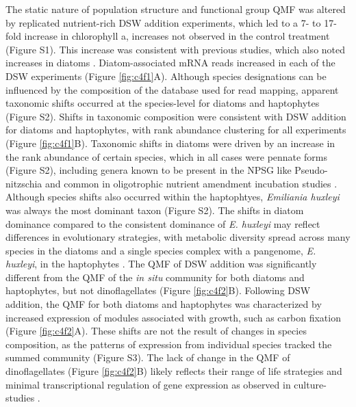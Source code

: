 The static nature of population structure and functional group QMF was altered by replicated nutrient-rich DSW addition experiments, which led to a 7- to 17-fold increase in chlorophyll a, increases not observed in the control treatment (Figure S1). This increase was consistent with previous studies, which also noted increases in diatoms \citep{McAndrew2007}. Diatom-associated mRNA reads increased in each of the DSW experiments (Figure \ref{fig:c4f1}A). Although species designations can be influenced by the composition of the database used for read mapping, apparent taxonomic shifts occurred at the species-level for diatoms and haptophytes (Figure S2). Shifts in taxonomic composition were consistent with DSW addition for diatoms and haptophytes, with rank abundance clustering for all experiments (Figure \ref{fig:c4f1}B).  Taxonomic shifts in diatoms were driven by an increase in the rank abundance of certain species, which in all cases were pennate forms (Figure S2), including genera known to be present in the NPSG like Pseudo-nitzschia \citep{Silver2010} and common in oligotrophic nutrient amendment incubation studies \citep{Marchetti2005, Marchetti2012a}. Although species shifts also occurred within the haptophtyes, \textit{Emiliania huxleyi} was always the most dominant taxon (Figure S2). The shifts in diatom dominance compared to the consistent dominance of \textit{E. huxleyi} may reflect differences in evolutionary strategies, with metabolic diversity spread across many species in the diatoms and a single species complex with a pangenome, \textit{E. huxleyi}, in the haptophytes \citep{Read2013}. The QMF of DSW addition was significantly different from the QMF of the \textit{in situ} community for both diatoms and haptophytes, but not dinoflagellates (Figure \ref{fig:c4f2}B). Following DSW addition, the QMF for both diatoms and haptophytes was characterized by increased expression of modules associated with growth, such as carbon fixation (Figure \ref{fig:c4f2}A). These shifts are not the result of changes in species composition, as the patterns of expression from individual species tracked the summed community (Figure S3). The lack of change in the QMF of dinoflagellates (Figure \ref{fig:c4f2}B) likely reflects their range of life strategies \citep{Hackett2004} and minimal transcriptional regulation of gene expression as observed in culture-studies \citep{Moustafa2010}. \par

